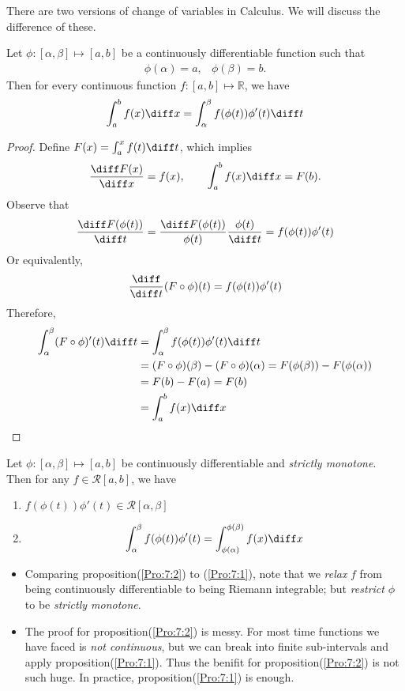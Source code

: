 %
There are two versions of change of variables in Calculus. We will discuss the difference of these.
\begin{proposition}\label{Pro:7:1}
Let $\phi:[\alpha,\beta]\mapsto[a,b]$ be a continuously differentiable function such that
\[
\begin{array}{ll}
\phi(\alpha)=a,
&
\phi(\beta)=b.
\end{array}
\]
Then for every continuous function $f:[a,b]\mapsto\mathbb{R}$, we have
\[
\int_a^bf(x)\diff x=\int_\alpha^\beta f(\phi(t))\phi'(t)\diff t
\]
\end{proposition}
\begin{proof}
Define $F(x)=\int_a^xf(t)\diff t$, which implies
\[
\frac{\diff F(x)}{\diff x}=f(x),
\qquad
\int_a^bf(x)\diff x=F(b).
\]
Observe that
\[
\frac{\diff F(\phi(t))}{\diff t}=\frac{\diff F(\phi(t))}{\phi(t)}\frac{\phi(t)}{\diff t}=f(\phi(t))\phi'(t)
\]
Or equivalently,
\[
\frac{\diff}{\diff t}(F\circ\phi)(t)=f(\phi(t))\phi'(t)
\]
Therefore,
\begin{align}
\int_\alpha^\beta(F\circ\phi)'(t)\diff t
&=
\int_\alpha^\beta f(\phi(t))\phi'(t)\diff t\\
&=
(F\circ\phi)(\beta) - (F\circ\phi)(\alpha)=F(\phi(\beta))-F(\phi(\alpha))\\
&=F(b)-F(a)=F(b)\\
&=\int_a^bf(x)\diff x
\end{align}
\end{proof}
\begin{proposition}\label{Pro:7:2}
Let $\phi:[\alpha,\beta]\mapsto[a,b]$ be continuously differentiable and \emph{strictly monotone}. Then for any $f\in\mathcal{R}[a,b]$, we have
\begin{enumerate}
\item
$f(\phi(t))\phi'(t)\in\mathcal{R}[\alpha,\beta]$
\item
\[
\int_\alpha^\beta f(\phi(t))\phi'(t)
=
\int_{\phi(\alpha)}^{\phi(\beta)}f(x)\diff x
\]
\end{enumerate}
\end{proposition}
\begin{remark}
\begin{itemize}
\item
Comparing proposition(\ref{Pro:7:2}) to (\ref{Pro:7:1}), note that we \emph{relax} $f$ from being continuously differentiable to being Riemann integrable; but \emph{restrict} $\phi$ to be \emph{strictly monotone}.
\item
The proof for proposition(\ref{Pro:7:2}) is messy. For most time functions we have faced is \textit{not continuous}, but we can break into finite sub-intervals and apply proposition(\ref{Pro:7:1}). Thus the benifit for proposition(\ref{Pro:7:2}) is not such huge. In practice, proposition(\ref{Pro:7:1}) is enough.
\end{itemize}
\end{remark}
